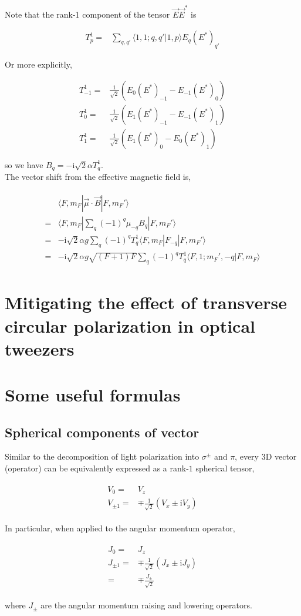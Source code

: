 \documentclass[10pt,fleqn]{article}
\newcommand{\ui}{\mathrm{i}}
\newcommand{\eqar}[1]
{
  \begin{align}
    #1
  \end{align}
}
\newcommand{\paren}[1]{{\left({#1}\right)}}
\begin{document}
Note that the rank-1 component of the tensor $\vec E\vec E^*$ is
\eqar{
  T^1_p=&\sum_{q,q'}\langle 1,1;q,q'|1,p\rangle E_{q}(E^*)_{q'}
}
Or more explicitly,
\eqar{
  T^1_{-1}=&\frac{1}{\sqrt{2}}\paren{E_{0}(E^*)_{-1}-E_{-1}(E^*)_{0}}\\
  T^1_{0}=&\frac{1}{\sqrt{2}}\paren{E_{1}(E^*)_{-1}-E_{-1}(E^*)_{1}}\\
  T^1_{1}=&\frac{1}{\sqrt{2}}\paren{E_{1}(E^*)_{0}-E_{0}(E^*)_{1}}
}
so we have $B_q=-\ui\sqrt2\alpha T^1_{q}$.\\

The vector shift from the effective magnetic field is,
\eqar{
  \begin{split}
    &\langle F,m_F|\vec\mu\cdot\vec B|F,m_F'\rangle\\
    =&\langle F,m_F|\sum_{q}(-1)^q\mu_{-q}B_{q}|F,m_F'\rangle\\
    =&-\ui\sqrt2\alpha g\sum_{q}(-1)^qT^1_{q}\langle F,m_F|F_{-q}|F,m_F'\rangle\\
    =&-\ui\sqrt2\alpha g\sqrt{(F+1)F}\sum_{q}(-1)^qT^1_{q}\langle F,1;m_F',-q|F,m_F\rangle
  \end{split}
}

\section{Mitigating the effect of transverse circular polarization in optical tweezers}


\appendix

\section{Some useful formulas}

\subsection{Spherical components of vector}

Similar to the decomposition of light polarization into $\sigma^\pm$ and $\pi$,
every 3D vector (operator) can be equivalently expressed
as a rank-$1$ spherical tensor,
\eqar{
  \begin{split}
    V_0=&V_z\\
    V_{\pm1}=&\mp\frac{1}{\sqrt2}\paren{V_x\pm\ui V_y}
  \end{split}
}

In particular, when applied to the angular momentum operator,
\eqar{
  \begin{split}
    J_0=&J_z\\
    J_{\pm1}=&\mp\frac{1}{\sqrt2}\paren{J_x\pm\ui J_y}\\
    =&\mp\frac{J_{\pm}}{\sqrt2}
  \end{split}
}
where $J_{\pm}$ are the angular momentum raising and lowering operators.\\
\end{document}

